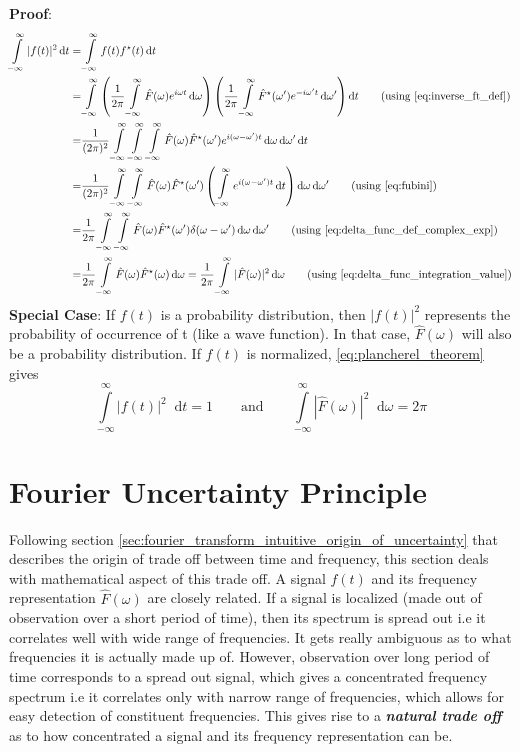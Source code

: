 \documentclass[11pt, a4paper]{article}
\let\oldsection\section
\renewcommand{\section}{%
	\setcounter{equation}{0}%
	\oldsection%
}
\newcommand{\quotedsingle}[1]{#1}	%
\newcommand{\quotedsingleit}[1]{\quotedsingle{\textit{#1}}}	%
\newcommand{\eqrefnp}[1]{\textup{\ref{#1}}}  %
\newcommand{\primed}[1]{#1^{\prime}}
\newcommand{\omegap}{\primed{\omega}}	%
\newcommand{\diff}{\mathop{}\!\mathrm{d}}
\newcommand{\dt}{\diff t}
\newcommand{\domega}{\diff \omega}
\newcommand{\domegap}{\diff \omegap}
\newcommand{\dint}[2]{\int \limits_{#1}^{#2}}  %
\newcommand{\intinfty}{\dint{-\infty}{\infty}}	%
\newcommand{\iintinfty}{\intinfty \intinfty}	%
\newcommand{\iiintinfty}{\intinfty \intinfty \intinfty}	%
\begin{document}
	\vspace{4pt}
	\noindent
	\textbf{Proof}: 
	\begin{align*}
		\intinfty |f(t)|^{2} \dt 
		= & \intinfty f(t)f^{\star}(t) \dt \\
		= & \intinfty \left(\frac{1}{2 \pi} \intinfty \hat{F}(\omega) e^{i \omega t} \domega \right) \left(\frac{1}{2 \pi} \intinfty \hat{F}^{\star}(\omegap) e^{-i \omegap t} \domegap \right) \dt \tag{using \eqrefnp{eq:inverse_ft_def}} \\
		= & \frac{1}{(2 \pi)^2} \iiintinfty \hat{F}(\omega) \hat{F}^{\star}(\omegap) e^{i (\omega - \omegap) t} \domega \domegap \dt \\
		= & \frac{1}{(2 \pi)^2} \iintinfty \hat{F}(\omega) \hat{F}^{\star}(\omegap) \left( \intinfty e^{i (\omega - \omegap) t} \dt \right) \domega \domegap \tag{using \eqrefnp{eq:fubini}} \\
		= & \frac{1}{2 \pi} \iintinfty \hat{F}(\omega) \hat{F}^{\star}(\omegap) \delta(\omega - \omegap) \domega \domegap \tag{using \eqrefnp{eq:delta_func_def_complex_exp}} \\
		= & \frac{1}{2 \pi} \intinfty \hat{F}(\omega) \hat{F}^{\star}(\omega) \domega 
		= \frac{1}{2 \pi} \intinfty |\hat{F}(\omega)|^{2} \domega  \tag{using \eqrefnp{eq:delta_func_integration_value}} \\
	\end{align*}
	\noindent
	\textbf{Special Case}: If $f(t)$ is a probability distribution, then $|f(t)|^{2}$ represents the probability of occurrence of t (like a wave function). In that case, $\hat{F}(\omega)$ will also be a probability distribution. If $f(t)$ is normalized, \eqref{eq:plancherel_theorem} gives
	\begin{equation}\label{eq:plancherel_normal_func_and_spectrum}
		\intinfty |f(t)|^{2} \dt = 1 \qquad \text{and} \qquad \intinfty |\hat{F}(\omega)|^{2} \domega = 2 \pi
	\end{equation}
	
	\section{Fourier Uncertainty Principle}\label{sec:fourier_uncertainity_principle}
	Following section \ref{sec:fourier_transform_intuitive_origin_of_uncertainty} that describes the origin of trade off between time and frequency, this section deals with mathematical aspect of this trade off. A signal $f(t)$ and its frequency representation $\hat{F}(\omega)$ are closely related. If a signal is localized (made out of observation over a short period of time), then its spectrum is spread out i.e it correlates well with wide range of frequencies. It gets really ambiguous as to what frequencies it is actually made up of. However, observation over long period of time corresponds to a spread out signal, which gives a concentrated frequency spectrum i.e it correlates only with narrow range of frequencies, which allows for easy detection of constituent frequencies. This gives rise to a \quotedsingleit{\textbf{natural trade off}} as to how concentrated a signal and its frequency representation can be.
	
\end{document}
